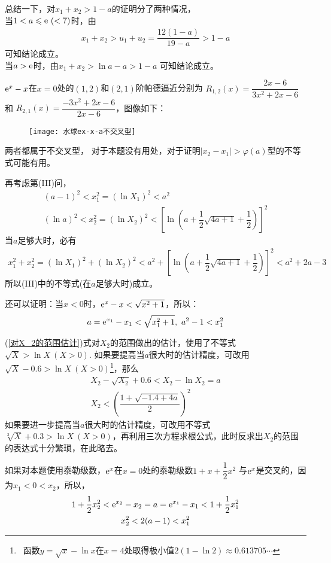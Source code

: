 \begin{enumerate}[label={【\textbf{例\thechapter.\arabic*}】},
 leftmargin=\inteval{\myenumleftmargin}pt,
 itemsep=\inteval{\myenumitempsep}pt,
 itemindent=\inteval{\myenumitemindent}pt]
总结一下，对$ x_1+x_2>1-a $的证明分了两种情况，\\
 当$ 1<a\leqslant \mathrm{e}\ (<7) $时，由
\begin{gather*}
    x_1+x_2>u_1+u_2=\dfrac{12(1-a)}{19-a}>1-a
\end{gather*}
可知结论成立。\\
 当$ a> \mathrm{e} $时，由$ x_1+x_2>\ln a-a>1-a $
可知结论成立。

$ \mathrm{e}^x-x $在$ x=0 $处的$ (1,2) $和$ (2,1) $阶帕德逼近分别为
$ R_{1,2}(x)=\dfrac{2x-6}{3x^2+2x-6} $和
$ R_{2,1}(x)=\dfrac{-3x^2+2x-6}{2x-6} $，图像如下：
\begin{figure}[H]
    \centering
    \texttt{[image: 水球ex-x-a不交叉型]}
\end{figure}
两者都属于不交叉型，
对于本题没有用处，对于证明$ |x_2-x_1|>\varphi(a) $型的不等式可能有用。

再考虑第(III)问，
\begin{gather*}
    (a-1)^2<x_1^2=(\ln X_1)^2<a^2 \\
    (\ln a)^2<x_2^2=(\ln X_2)^2<
    \left[\ln\left(a+\dfrac{1}{2}\sqrt{4a+1}+\dfrac{1}{2}\right)\right]^2
\end{gather*}
当$ a $足够大时，必有
\begin{gather*}
    x_1^2+x_2^2=(\ln X_1)^2+(\ln X_2)^2<a^2+\left[\ln\left(a+\dfrac{1}{2}
    \sqrt{4a+1}+\dfrac{1}{2}\right)\right]^2<a^2+2a-3
\end{gather*} 
所以(III)中的不等式(在$ a $足够大时)成立。

还可以证明：当$ x<0 $时，$ \mathrm{e}^x-x<\sqrt{x^2+1} $，所以：
\begin{gather*}
    a=\mathrm{e}^{x_1}-x_1<\sqrt{x_1^2+1},\ a^2-1<x_1^2
\end{gather*}

(\ref{对X_2的范围估计})式对$ X_2 $的范围做出的估计，使用了不等式$ \sqrt{X}>\ln X \ (X>0) $. 如果要提高当$ a $很大时的估计精度，可改用$ \sqrt{X}-0.6 >\ln X \ (X>0) $\footnote{\ 函数$ y=\sqrt{x}-\ln x $在$ x=4 $处取得极小值$ 2(1-\ln2)\approx 0.613705\cdots $}，那么
\begin{gather*}
    X_2-\sqrt{X_2}+0.6<X_2-\ln X_2=a \\
    X_2< \left(\dfrac{1+\sqrt{-1.4+4a}}{2}\right)^2
\end{gather*}
如果要进一步提高当$ a $很大时的估计精度，可改用不等式$ \sqrt[3]{X}+0.3 >\ln X \ (X>0) $，再利用三次方程求根公式，此时反求出$ X_2 $的范围的表达式十分繁琐，在此略去。

如果对本题使用泰勒级数，$ \mathrm{e}^x $在$ x=0 $处的泰勒级数$ 1+x+\dfrac{1}{2}x^2 $
与$ \mathrm{e}^x $是交叉的，因为$ x_1<0<x_2 $，所以，
\begin{gather*}
    1+\dfrac{1}{2}x_2^2 < \mathrm{e}^{x_2}-x_2=a=\mathrm{e}^{x_1}-x_1<1+\dfrac{1}{2}x_1^2 \\
    x_2^2<2(a-1)<x_1^2
\end{gather*} 


\end{enumerate}
